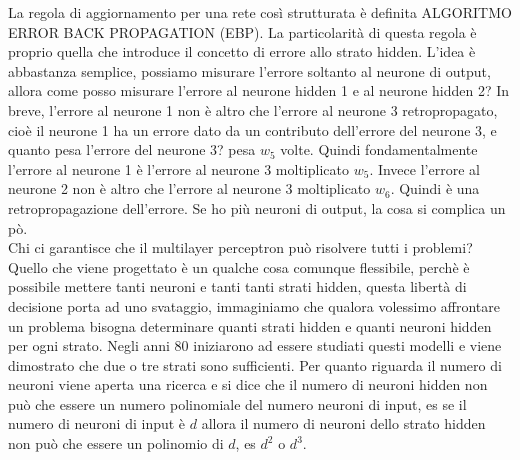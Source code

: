 \noindent La regola di aggiornamento per una rete così strutturata è definita ALGORITMO ERROR BACK PROPAGATION (EBP). La particolarità di questa regola è proprio quella che introduce il concetto di errore allo strato hidden. L'idea è abbastanza semplice, possiamo misurare l'errore soltanto al neurone di output, allora come posso misurare l'errore al neurone hidden 1 e al neurone hidden 2? In breve, l'errore al neurone 1 non è altro che l'errore al neurone 3 retropropagato, cioè il neurone 1 ha un errore dato da un contributo dell'errore del neurone 3, e quanto pesa l'errore del neurone 3? pesa $w_5$ volte. Quindi fondamentalmente l'errore al neurone 1 è l'errore al neurone 3 moltiplicato $w_5$. Invece l'errore al neurone 2 non è altro che l'errore al neurone 3 moltiplicato $w_6$. Quindi è una retropropagazione dell'errore. Se ho più neuroni di output, la cosa si complica un pò.\\

\noindent Chi ci garantisce che il multilayer perceptron può risolvere tutti i problemi? Quello che viene progettato è un qualche cosa comunque flessibile, perchè è possibile mettere tanti neuroni e tanti tanti strati hidden, questa libertà di decisione porta ad uno svataggio, immaginiamo che qualora volessimo affrontare un problema bisogna determinare quanti strati hidden e quanti neuroni hidden per ogni strato. Negli anni 80 iniziarono ad essere studiati questi modelli e viene dimostrato che due o tre strati sono sufficienti. Per quanto riguarda il numero di neuroni viene aperta una ricerca e si dice che il numero di neuroni hidden non può che essere un numero polinomiale del numero neuroni di input, es se il numero di neuroni di input è $d$ allora il numero di neuroni dello strato hidden non può che essere un polinomio di $d$, es $d^2$ o $d^3$.\\

